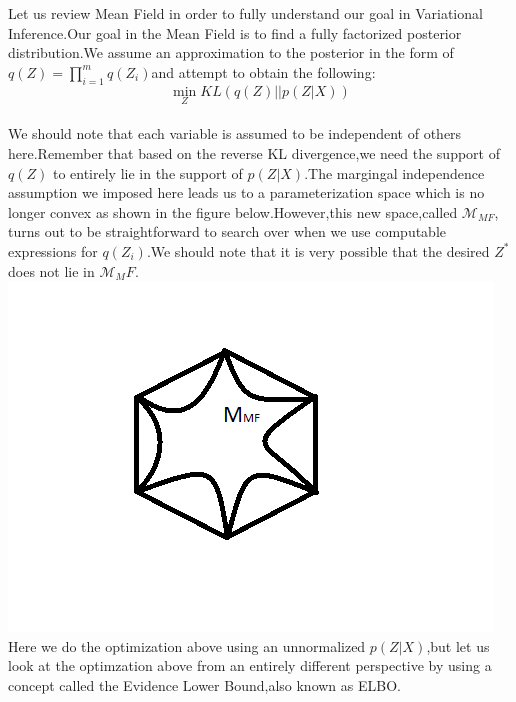 \documentclass[twoside]{article}
\begin{document}
Let us review Mean Field in order to fully understand our goal in Variational Inference.Our goal in the Mean Field is to find a fully factorized posterior distribution.We assume an approximation to the posterior in the form of $q(Z)=\prod_{i=1}^m{q(Z_i)}$and attempt to obtain the following:\\
\[ \min_{Z}{KL(q(Z)||p(Z|X))} \]\\
We should note that each variable is assumed to be independent of others here.Remember that based on the reverse KL divergence,we need the support of $q(Z)$ to entirely lie in the support of $p(Z|X)$.The margingal independence assumption we imposed here leads us to a parameterization space which is no longer convex as shown in the figure below.However,this new space,called $\mathcal{M}_{MF}$, turns out to be straightforward to search over when we use  computable expressions for $q(Z_i)$.We should note that it is very possible that the desired $Z^*$ does not lie in $\mathcal{M}_MF$.\\
\includegraphics{convexpolytope}\\
Here we do the optimization above using an unnormalized $p(Z|X)$,but let us look at the optimzation above from an entirely different perspective by using a concept called the Evidence Lower Bound,also known as ELBO.
\end{document}
